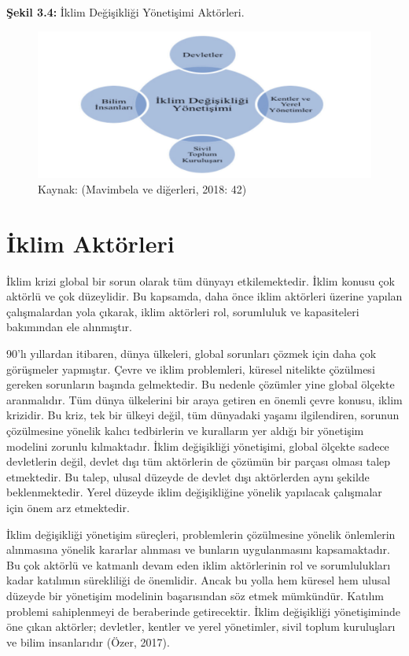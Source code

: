 \documentclass[
]{book}
\begin{document}
\textbf{Şekil 3.4:} İklim Değişikliği Yönetişimi Aktörleri.

\begin{figure}
\includegraphics[width=0.95\linewidth,height=0.95\textheight]{tablolar-sekiller/sekil-3-4} \caption{Kaynak: (Mavimbela ve diğerleri, 2018: 42)}\label{fig:unnamed-chunk-8}
\end{figure}

\hypertarget{iklim-aktuxf6rleri}{%
\section{İklim Aktörleri}\label{iklim-aktuxf6rleri}}

İklim krizi global bir sorun olarak tüm dünyayı etkilemektedir. İklim konusu çok aktörlü ve çok düzeylidir. Bu kapsamda, daha önce iklim aktörleri üzerine yapılan çalışmalardan yola çıkarak, iklim aktörleri rol, sorumluluk ve kapasiteleri bakımından ele alınmıştır.

90'lı yıllardan itibaren, dünya ülkeleri, global sorunları çözmek için daha çok görüşmeler yapmıştır. Çevre ve iklim problemleri, küresel nitelikte çözülmesi gereken sorunların başında gelmektedir. Bu nedenle çözümler yine global ölçekte aranmalıdır. Tüm dünya ülkelerini bir araya getiren en önemli çevre konusu, iklim krizidir. Bu kriz, tek bir ülkeyi değil, tüm dünyadaki yaşamı ilgilendiren, sorunun çözülmesine yönelik kalıcı tedbirlerin ve kuralların yer aldığı bir yönetişim modelini zorunlu kılmaktadır. İklim değişikliği yönetişimi, global ölçekte sadece devletlerin değil, devlet dışı tüm aktörlerin de çözümün bir parçası olması talep etmektedir. Bu talep, ulusal düzeyde de devlet dışı aktörlerden aynı şekilde beklenmektedir. Yerel düzeyde iklim değişikliğine yönelik yapılacak çalışmalar için önem arz etmektedir.

İklim değişikliği yönetişim süreçleri, problemlerin çözülmesine yönelik önlemlerin alınmasına yönelik kararlar alınması ve bunların uygulanmasını kapsamaktadır. Bu çok aktörlü ve katmanlı devam eden iklim aktörlerinin rol ve sorumlulukları kadar katılımın sürekliliği de önemlidir. Ancak bu yolla hem küresel hem ulusal düzeyde bir yönetişim modelinin başarısından söz etmek mümkündür. Katılım problemi sahiplenmeyi de beraberinde getirecektir. İklim değişikliği yönetişiminde öne çıkan aktörler; devletler, kentler ve yerel yönetimler, sivil toplum kuruluşları ve bilim insanlarıdır (Özer, 2017). \citep{ozer2017iklim}
\end{document}
